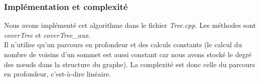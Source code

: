    \subsubsection{Implémentation et complexité}
   \indent Nous avons implémenté cet algorithme dans le fichier
   \emph{Tree.cpp}. Les méthodes sont \emph{coverTree} et
   \emph{coverTree\_aux}.\\
   Il n'utilise qu'un parcours en profondeur et des calculs constants
   (le calcul du nombre de voisins d'un sommet est aussi constant car
   nous avons stocké le degré des n\oe{}uds dans la structure du
   graphe). La complexité est donc celle du parcours en profondeur,
   c'est-à-dire linéaire.